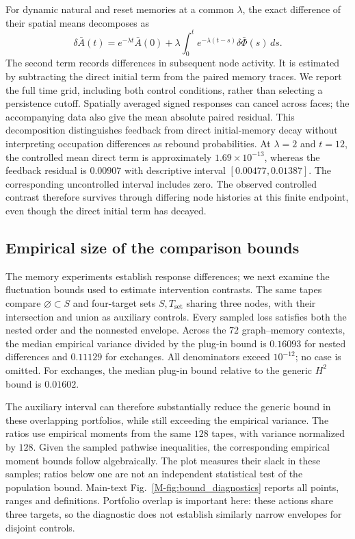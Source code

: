 \documentclass[preprint,11pt,sort&compress]{elsarticle}
\begin{document}
For dynamic natural and reset memories at a common $\lambda$, the exact difference of their spatial means decomposes as
\[
 \delta\bar A(t)=e^{-\lambda t}\bar A(0)
 +\lambda\int_0^t e^{-\lambda(t-s)}\delta\bar\Phi(s)\,ds.
\]
The second term records differences in subsequent node activity. It is estimated by subtracting the direct initial term from the paired memory traces. We report the full time grid, including both control conditions, rather than selecting a persistence cutoff. Spatially averaged signed responses can cancel across faces; the accompanying data also give the mean absolute paired residual. This decomposition distinguishes feedback from direct initial-memory decay without interpreting occupation differences as rebound probabilities. At $\lambda=2$ and $t=12$, the controlled mean direct term is approximately $1.69\times10^{-13}$, whereas the feedback residual is $0.00907$ with descriptive interval $[0.00477,0.01387]$. The corresponding uncontrolled interval includes zero. The observed controlled contrast therefore survives through differing node histories at this finite endpoint, even though the direct initial term has decayed.



\subsection{Empirical size of the comparison bounds}
The memory experiments establish response differences; we next examine the fluctuation bounds used to estimate intervention contrasts. The same tapes compare $\varnothing\subset S$ and four-target sets $S,T_{\mathrm{set}}$ sharing three nodes, with their intersection and union as auxiliary controls. Every sampled loss satisfies both the nested order and the nonnested envelope. Across the $72$ graph--memory contexts, the median empirical variance divided by the plug-in bound is $0.16093$ for nested differences and $0.11129$ for exchanges. All denominators exceed $10^{-12}$; no case is omitted. For exchanges, the median plug-in bound relative to the generic $H^2$ bound is $0.01602$.

The auxiliary interval can therefore substantially reduce the generic bound in these overlapping portfolios, while still exceeding the empirical variance. The ratios use empirical moments from the same $128$ tapes, with variance normalized by $128$. Given the sampled pathwise inequalities, the corresponding empirical moment bounds follow algebraically. The plot measures their slack in these samples; ratios below one are not an independent statistical test of the population bound. Main-text Fig.~\ref{M-fig:bound_diagnostics} reports all points, ranges and definitions. Portfolio overlap is important here: these actions share three targets, so the diagnostic does not establish similarly narrow envelopes for disjoint controls.
\end{document}

